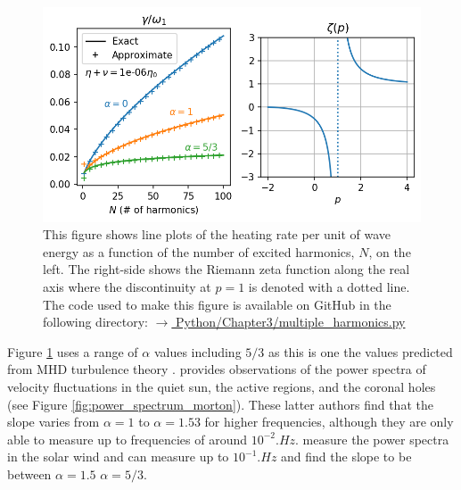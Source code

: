 \begin{figure}
    \centering
    \vspace{-20pt}
    \includegraphics[width=\textwidth,height=0.85\textheight,keepaspectratio]{figures/chapter03/multiple_harmonics.png}
    \vspace{-30pt}
    \caption{This figure shows line plots of the heating rate per unit of wave energy as a function of the number of excited harmonics, $N$, on the left. 
    The right-side shows the Riemann zeta function along the real axis where the discontinuity at $p=1$ is denoted with a dotted line. The code used to make this figure is available on GitHub in the following directory:\newline
    \href{https://github.com/aleksyprok/apkp_thesis/blob/main/Python/Chapter3/multiple_harmonics.py}{$\rightarrow$ Python/Chapter3/multiple\_harmonics.py}}
    \vspace{-20pt}
    \label{fig:multiple_harmonics}
\end{figure}

Figure \ref{fig:multiple_harmonics} uses a range of $\alpha$ values including $5/3$ as this is one the values predicted from MHD turbulence theory \citep{Bruno2013}. \citet{Morton2016} provides observations of the power spectra of velocity fluctuations in the quiet sun, the active regions, and the coronal holes (see Figure \ref{fig:power_spectrum_morton}). These latter authors find that the slope varies from $\alpha = 1$ to $\alpha = 1.53$ for higher frequencies, although they are only able to measure up to frequencies of around $10^{-2}\si{.Hz}$. \citet{Podesta2007} measure the power spectra in the solar wind and can measure up to $10^{-1}\si{.Hz}$ and find the slope to be between $\alpha = 1.5$ $\alpha = 5/3$.

